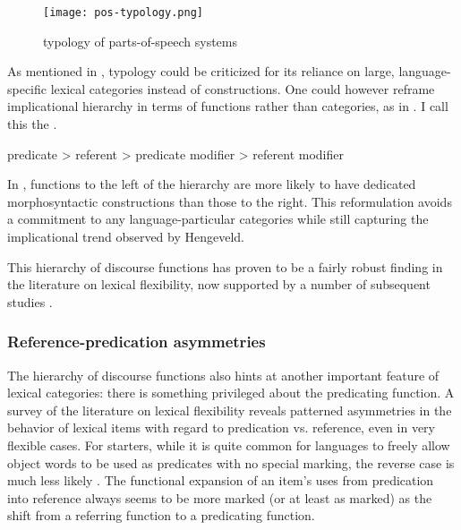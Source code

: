 \begin{figure}[h]
  \centering
  \texttt{[image: pos-typology.png]}
  \caption[Hengeveld's (1992) typology of parts-of-speech systems]{ \parencite*[69]{Hengeveld1992} typology of parts-of-speech systems}
  \label{fig:Hengeveld-pos-systems}
\end{figure}

As mentioned in ,  typology could be criticized for its reliance on large, language-specific lexical categories instead of constructions. One could however reframe  implicational hierarchy in terms of functions rather than categories, as in . I call this the .

\begin{exe}
  \ex\label{ex:2.9} predicate > referent > predicate modifier > referent modifier
\end{exe}

\noindent In , functions to the left of the hierarchy are more likely to have dedicated morphosyntactic constructions than those to the right. This reformulation avoids a commitment to any language-particular categories while still capturing the implicational trend observed by Hengeveld.

This hierarchy of discourse functions has proven to be a fairly robust finding in the literature on lexical flexibility, now supported by a number of subsequent studies \parencites{Anward2000}{Rijkhoff2000}{Vogel2000}{Beck2002}{Rijkhoff2002}{Rijkhoff2003}{HengeveldRijkhoffSiewierska2004}{Lier2006}{Hengeveld2007}{HengeveldLier2012}{HengeveldValstar2010}{Beck2013}{Bisang2013}{Hengeveld2013}.

\subsubsection{Reference-predication asymmetries}
\label{sec:2.3.2.2}

The hierarchy of discourse functions also hints at another important feature of lexical categories: there is something privileged about the predicating function. A survey of the literature on lexical flexibility reveals patterned asymmetries in the behavior of lexical items with regard to predication vs. reference, even in very flexible cases. For starters, while it is quite common for languages to freely allow object words to be used as predicates with no special marking, the reverse case is much less likely \textcite[745]{HopperThompson1984}. The functional expansion of an item's uses from predication into reference always seems to be more marked (or at least as marked) as the shift from a referring function to a predicating function.


